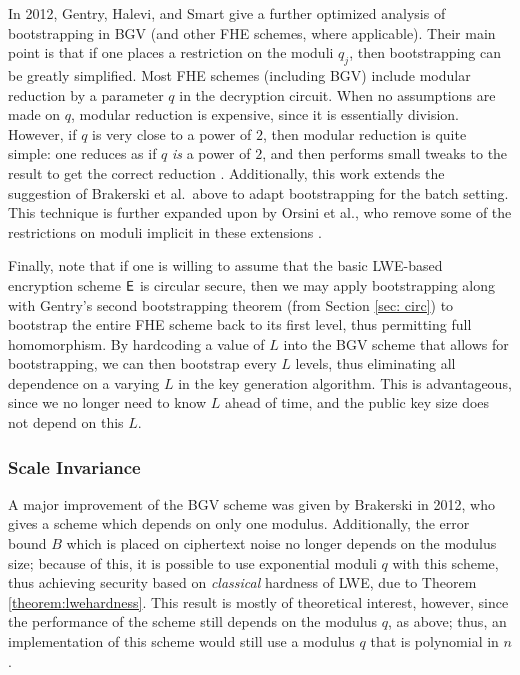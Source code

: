         In 2012, Gentry, Halevi, and Smart give a further optimized analysis of bootstrapping in BGV (and other FHE schemes, where applicable). Their main point is that if one places a restriction on the moduli $q_j$, then bootstrapping can be greatly simplified. Most FHE schemes (including BGV) include modular reduction by a parameter $q$ in the decryption circuit. When no assumptions are made on $q$, modular reduction is expensive, since it is essentially division. However, if $q$ is very close to a power of $2$, then modular reduction is quite simple: one reduces as if $q$ \emph{is} a power of $2$, and then performs small tweaks to the result to get the correct reduction \cite{ghsbootstrap}. Additionally, this work extends the suggestion of Brakerski et al.~above to adapt bootstrapping for the batch setting. This technique is further expanded upon by Orsini et al., who remove some of the restrictions on moduli implicit in these extensions \cite{Orsini2015}.



    Finally, note that if one is willing to assume that the basic LWE-based encryption scheme ${\sf E}$ is circular secure, then we may apply bootstrapping along with Gentry's second bootstrapping theorem (from Section \ref{sec: circ}) to bootstrap the entire FHE scheme back to its first level, thus permitting full homomorphism. By hardcoding a value of $L$ into the BGV scheme that allows for bootstrapping, we can then bootstrap every $L$ levels, thus eliminating all dependence on a varying $L$ in the key generation algorithm. This is advantageous, since we no longer need to know $L$ ahead of time, and the public key size does not depend on this $L$.

    \subsubsection{Scale Invariance}
        A major improvement of the BGV scheme was given by Brakerski in 2012, who gives a scheme which depends on only one modulus. Additionally, the error bound $B$ which is placed on ciphertext noise no longer depends on the modulus size; because of this, it is possible to use exponential moduli $q$ with this scheme, thus achieving security based on \emph{classical} hardness of LWE, due to Theorem \ref{theorem:lwehardness}. This result is mostly of theoretical interest, however, since the performance of the scheme still depends on the modulus $q$, as above; thus, an implementation of this scheme would still use a modulus $q$ that is polynomial in $n$.

